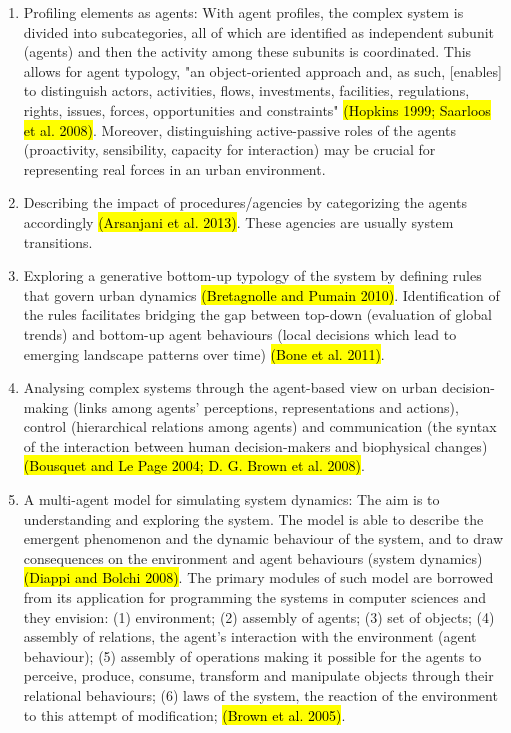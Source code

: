 \documentclass[11pt]{report}
\begin{document}
\begin{enumerate}
\item Profiling elements as agents: 
With agent profiles, the complex system is divided into subcategories, all of which are identified as independent subunit (agents) and then the activity among these subunits is coordinated. This allows for agent typology, "an object-oriented approach and, as such, [enables] to distinguish actors, activities, flows, investments, facilities, regulations, rights, issues, forces, opportunities and constraints" \hl{(Hopkins 1999; Saarloos et al. 2008)}. 
Moreover, distinguishing active-passive roles of the agents (proactivity, sensibility, capacity for interaction) may be crucial for representing real forces in an urban environment.
 
\item Describing the impact of procedures/agencies by categorizing the agents accordingly \hl{(Arsanjani et al. 2013)}. These agencies are usually system transitions.

\item Exploring a generative bottom-up typology of the system by defining rules that govern urban dynamics \hl{(Bretagnolle and Pumain 2010)}.
Identification of the rules facilitates bridging the gap between top-down (evaluation of global trends) and bottom-up agent behaviours (local decisions which lead to emerging landscape patterns over time) \hl{(Bone et al. 2011)}. 

\item Analysing complex systems through the agent-based view on urban decision-making (links among agents' perceptions, representations and actions), control (hierarchical relations among agents) and communication (the syntax of the interaction between human decision-makers and biophysical changes) \hl{(Bousquet and Le Page 2004; D. G. Brown et al. 2008)}.

\item A multi-agent model for simulating system dynamics: The aim is to understanding and exploring the system. The model is able to describe the emergent phenomenon and the dynamic behaviour of the system,  and to draw  consequences on the environment and agent behaviours (system dynamics) \hl{(Diappi and Bolchi 2008)}. The primary modules of such model are borrowed from its application for programming the systems in computer sciences and they envision: (1) environment; (2) assembly of agents; (3) set of objects; (4) assembly of relations, the agent’s interaction with the environment (agent behaviour); (5) assembly of operations making it possible for the agents to perceive, produce, consume, transform and manipulate objects through their relational behaviours; (6) laws of the system, the reaction  of  the  environment  to  this  attempt  of  modification; \hl{(Brown et al. 2005)}.
\end{enumerate}
\end{document}
